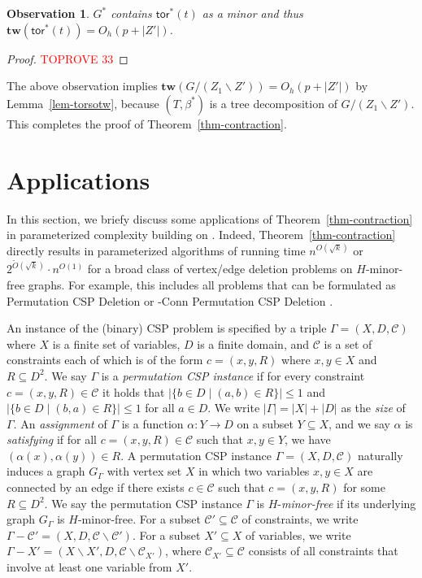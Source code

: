 \documentclass[a4paper,11pt]{article}
\numberwithin{lemma}{section}
\newtheorem{observation}[lemma]{Observation}
\newcommand{\tw}{\mathbf{tw}}
\newcommand{\tor}{\mathsf{tor}}
\begin{document}
\begin{observation}
$G^*$ contains $\tor^*(t)$ as a minor and thus $\tw(\tor^*(t)) = O_h(p+|Z'|)$.
\end{observation}
\begin{proof}\textcolor{red}{TOPROVE 33}\end{proof}

The above observation implies $\tw(G/(Z_1 \backslash Z')) = O_h(p+|Z'|)$ by Lemma~\ref{lem-torsotw}, because $(T,\beta^*)$ is a tree decomposition of $G/(Z_1 \backslash Z')$.
This completes the proof of Theorem~\ref{thm-contraction}.
 

\section{Applications}
\label{sec-app}

In this section, we briefy discuss some applications of Theorem~\ref{thm-contraction} in parameterized complexity building on \cite{BandyapadhyayLLSJ22,MarxMNT22}.
Indeed, Theorem~\ref{thm-contraction} directly results in parameterized algorithms of running time $n^{O(\sqrt{k})}$ or $2^{\widetilde{O}(\sqrt{k})} \cdot n^{O(1)}$ for a broad class of vertex/edge deletion problems on $H$-minor-free graphs.
For example, this includes all problems that can be formulated as {\sc Permutation CSP Deletion} or {-Conn Permutation CSP Deletion} \cite{MarxMNT22}.

An instance of the (binary) CSP problem is specified by a triple $\varGamma = (X,D,\mathcal{C})$ where $X$ is a finite set of variables, $D$ is a finite domain, and $\mathcal{C}$ is a set of constraints each of which is of the form $c = (x,y,R)$ where $x,y \in X$ and $R \subseteq D^2$.
We say $\varGamma$ is a \emph{permutation CSP instance} if for every constraint $c = (x,y,R) \in \mathcal{C}$ it holds that $|\{b \in D \mid (a,b) \in R\}| \leq 1$ and $|\{b \in D \mid (b,a) \in R\}| \leq 1$ for all $a \in D$.
We write $|\varGamma| = |X| + |D|$ as the \emph{size} of $\varGamma$.
An \emph{assignment} of $\varGamma$ is a function $\alpha: Y \rightarrow D$ on a subset $Y \subseteq X$, and we say $\alpha$ is \emph{satisfying} if for all $c = (x,y,R) \in \mathcal{C}$ such that $x,y \in Y$, we have $(\alpha(x),\alpha(y)) \in R$.
A permutation CSP instance $\varGamma = (X,D,\mathcal{C})$ naturally induces a graph $G_\varGamma$ with vertex set $X$ in which two variables $x,y \in X$ are connected by an edge if there exists $c \in \mathcal{C}$ such that $c = (x,y,R)$ for some $R \subseteq D^2$.
We say the permutation CSP instance $\varGamma$ is $H$-\emph{minor-free} if its underlying graph $G_\varGamma$ is $H$-minor-free.
For a subset $\mathcal{C}' \subseteq \mathcal{C}$ of constraints, we write $\varGamma - \mathcal{C}' = (X,D,\mathcal{C} \backslash \mathcal{C}')$.
For a subset $X' \subseteq X$ of variables, we write $\varGamma - X' = (X \backslash X',D,\mathcal{C} \backslash \mathcal{C}_{X'})$, where $\mathcal{C}_{X'} \subseteq \mathcal{C}$ consists of all constraints that involve at least one variable from $X'$.
\end{document}
